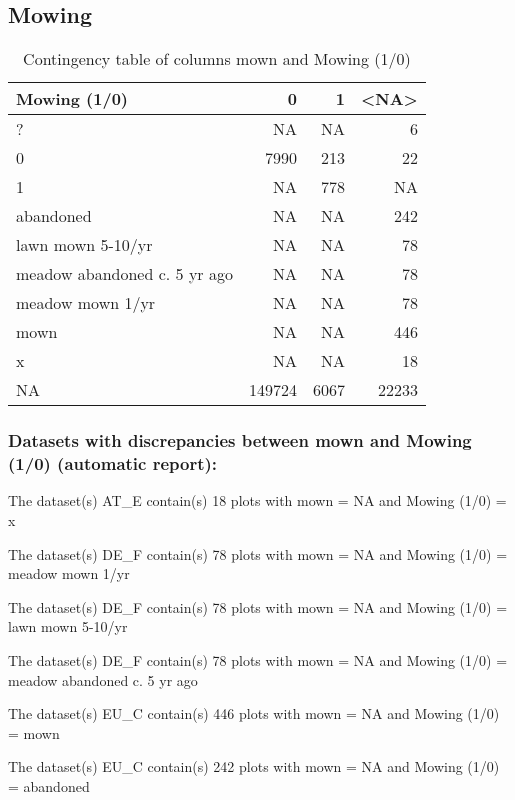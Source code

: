 \documentclass[table]{article}
\begin{document}
\subsection{Mowing}\label{mowing}

\begin{table}[H]

\caption{\label{tab:unnamed-chunk-18}Contingency table of columns mown and Mowing (1/0)}
\centering
\begin{tabular}[t]{l|r|r|r}
\hline
Mowing (1/0) & 0 & 1 & <NA>\\
\hline
? & NA & NA & 6\\
\hline
0 & 7990 & 213 & 22\\
\hline
1 & NA & 778 & NA\\
\hline
abandoned & NA & NA & 242\\
\hline
lawn mown 5-10/yr & NA & NA & 78\\
\hline
meadow abandoned c. 5 yr ago & NA & NA & 78\\
\hline
meadow mown 1/yr & NA & NA & 78\\
\hline
mown & NA & NA & 446\\
\hline
x & NA & NA & 18\\
\hline
NA & 149724 & 6067 & 22233\\
\hline
\end{tabular}
\end{table}

\subsubsection{Datasets with discrepancies between mown and Mowing (1/0)
(automatic
report):}\label{datasets-with-discrepancies-between-mown-and-mowing-10-automatic-report}

The dataset(s) AT\_E contain(s) 18 plots with mown = NA and Mowing (1/0)
= x

The dataset(s) DE\_F contain(s) 78 plots with mown = NA and Mowing (1/0)
= meadow mown 1/yr

The dataset(s) DE\_F contain(s) 78 plots with mown = NA and Mowing (1/0)
= lawn mown 5-10/yr

The dataset(s) DE\_F contain(s) 78 plots with mown = NA and Mowing (1/0)
= meadow abandoned c. 5 yr ago

The dataset(s) EU\_C contain(s) 446 plots with mown = NA and Mowing
(1/0) = mown

The dataset(s) EU\_C contain(s) 242 plots with mown = NA and Mowing
(1/0) = abandoned
\end{document}
